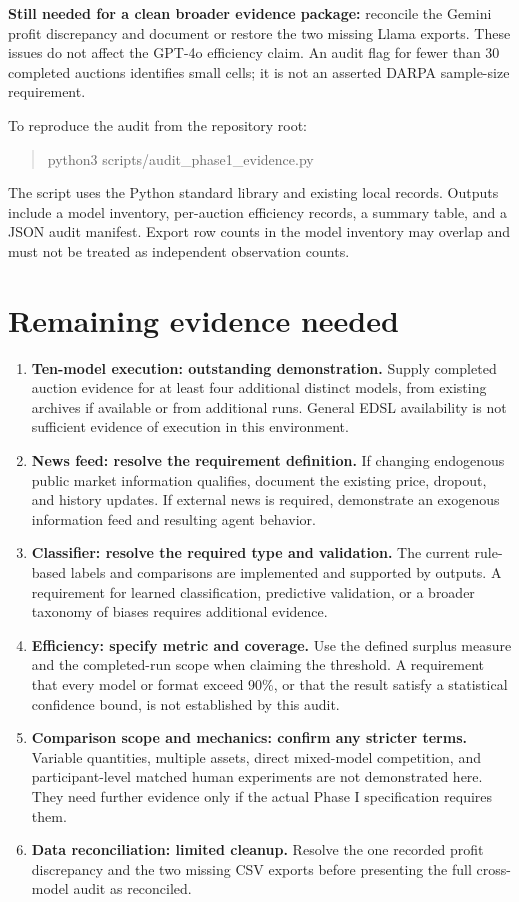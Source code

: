 \documentclass[11pt,letterpaper]{article}
\begin{document}
\textbf{Still needed for a clean broader evidence package:} reconcile the
Gemini profit discrepancy and document or restore the two missing Llama
exports. These issues do not affect the GPT-4o efficiency claim. An audit flag
for fewer than 30 completed auctions identifies small cells; it is not an
asserted DARPA sample-size requirement.

\begin{samepage}
To reproduce the audit from the repository root:
\begin{quote}
\ttfamily\small python3 scripts/audit\_phase1\_evidence.py
\end{quote}
\end{samepage}
The script uses the Python standard library and existing local records.
Outputs include a model inventory, per-auction efficiency records, a summary
table, and a JSON audit manifest. Export row counts in the model inventory
may overlap and must not be treated as independent observation counts.

\section{Remaining evidence needed}

\begin{enumerate}
  \item \textbf{Ten-model execution: outstanding demonstration.} Supply
  completed auction evidence for at least four additional distinct models,
  from existing archives if available or from additional runs. General EDSL
  availability is not sufficient evidence of execution in this environment.
  \item \textbf{News feed: resolve the requirement definition.} If changing
  endogenous public market information qualifies, document the existing
  price, dropout, and history updates. If external news is required,
  demonstrate an exogenous information feed and resulting agent behavior.
  \item \textbf{Classifier: resolve the required type and validation.} The
  current rule-based labels and comparisons are implemented and supported by
  outputs. A requirement for learned classification, predictive validation,
  or a broader taxonomy of biases requires additional evidence.
  \item \textbf{Efficiency: specify metric and coverage.} Use the defined
  surplus measure and the completed-run scope when claiming the threshold.
  A requirement that every model or format exceed 90\%, or that the result
  satisfy a statistical confidence bound, is not established by this audit.
  \item \textbf{Comparison scope and mechanics: confirm any stricter terms.}
  Variable quantities, multiple assets, direct mixed-model competition, and
  participant-level matched human experiments are not demonstrated here.
  They need further evidence only if the actual Phase I specification
  requires them.
  \item \textbf{Data reconciliation: limited cleanup.} Resolve the one
  recorded profit discrepancy and the two missing CSV exports before
  presenting the full cross-model audit as reconciled.
\end{enumerate}
\end{document}
